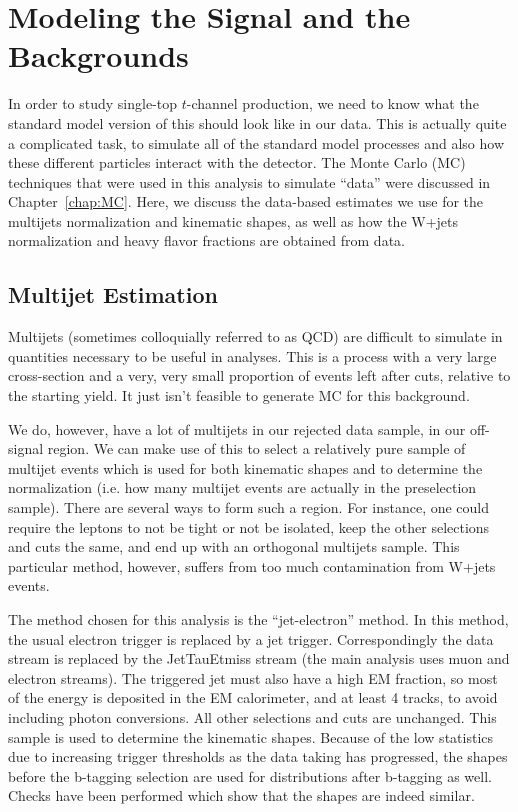 \chapter{Modeling the Signal and the Backgrounds}\label{chap:bkgd}
In order to study single-top $t$-channel production, we need to know what the standard model version of this should look like in our data.  This is actually quite a complicated task, to simulate all of the standard model processes and also how these different particles interact with the detector.  The Monte Carlo (MC) techniques that were used in this analysis to simulate ``data'' were discussed in Chapter~\ref{chap:MC}.  Here, we discuss the data-based estimates we use for the multijets normalization and kinematic shapes, as well as how the W+jets normalization and heavy flavor fractions are obtained from data.

\section{Multijet Estimation}\label{sec:multijets} 
Multijets (sometimes colloquially referred to as QCD) are difficult to simulate in quantities necessary to be useful in analyses.  This is a process with a very large cross-section and a very, very small proportion of events left after cuts, relative to the starting yield.  It just isn't feasible to generate MC for this background.

We do, however, have a lot of multijets in our rejected data sample, in our off-signal region.  We can make use of this to select a relatively pure sample of multijet events which is used for both kinematic shapes and to determine the normalization (i.e. how many multijet events are actually in the preselection sample).  There are several ways to form such a region.  For instance, one could require the leptons to not be tight or not be isolated, keep the other selections and cuts the same, and end up with an orthogonal multijets sample.  This particular method, however, suffers from too much contamination from W+jets events.

The method chosen for this analysis is the ``jet-electron'' method.  In this method, the usual electron trigger is replaced by a jet trigger.  Correspondingly the data stream is replaced by the JetTauEtmiss stream (the main analysis uses muon and electron streams).  The triggered jet must also have a high EM fraction, so most of the energy is deposited in the EM calorimeter, and at least 4 tracks, to avoid including photon conversions.  All other selections and cuts are unchanged.  This sample is used to determine the kinematic shapes.  Because of the low statistics due to increasing trigger thresholds as the data taking has progressed, the shapes before the b-tagging selection are used for distributions after b-tagging as well.  Checks have been performed which show that the shapes are indeed similar.

